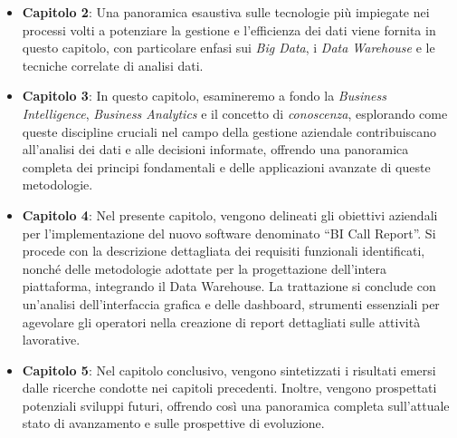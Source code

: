 \begin{itemize}
    \item \textbf{Capitolo 2}: Una panoramica esaustiva sulle tecnologie più impiegate nei processi volti a potenziare la gestione e l'efficienza dei dati viene fornita in questo capitolo, con particolare enfasi sui \textit{Big Data}, i \textit{Data Warehouse} e le tecniche correlate di analisi dati.

    \item \textbf{Capitolo 3}: In questo capitolo, esamineremo a fondo la \textit{Business Intelligence}, \textit{Business Analytics} e il concetto di \textit{conoscenza}, esplorando come queste discipline cruciali nel campo della gestione aziendale contribuiscano all'analisi dei dati e alle decisioni informate, offrendo una panoramica completa dei principi fondamentali e delle applicazioni avanzate di queste metodologie.

    \item \textbf{Capitolo 4}: Nel presente capitolo, vengono delineati gli obiettivi aziendali per l'implementazione del nuovo software denominato ``BI Call Report''. Si procede con la descrizione dettagliata dei requisiti funzionali identificati, nonché delle metodologie adottate per la progettazione dell'intera piattaforma, integrando il Data Warehouse. La trattazione si conclude con un'analisi dell'interfaccia grafica e delle dashboard, strumenti essenziali per agevolare gli operatori nella creazione di report dettagliati sulle attività lavorative.

    \item \textbf{Capitolo 5}: Nel capitolo conclusivo, vengono sintetizzati i risultati emersi dalle ricerche condotte nei capitoli precedenti. Inoltre, vengono prospettati potenziali sviluppi futuri, offrendo così una panoramica completa sull'attuale stato di avanzamento e sulle prospettive di evoluzione.
\end{itemize}